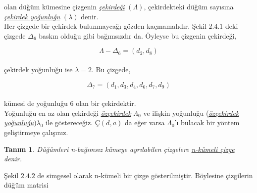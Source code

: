 \documentclass[12]{article}
\newtheorem{definition}{Tanım}[theorem]
\begin{document}
olan düğüm kümesine çizgenin \textit{\underline{çekirdeği}} $(\Lambda)$, çekirdekteki düğüm sayısına \textit{\underline{çekirdek yoğunluğu}} $(\lambda)$ denir. \\

Her çizgede bir çekirdek bulunmaycağı gözden kaçmamalıdır. Şekil $2.4.1$ deki  çizgede $\Delta_6$ baskın olduğu gibi bağımsızdır da. Öyleyse bu çizgenin çekirdeği,

$$ \Lambda - \Delta_6 = (d_2,d_8) $$ \\
çekirdek yoğunluğu ise $ \lambda = 2 $. 
Bu çizgede, 

$$ \Delta_7 = (d_1 , d_3 , d_4 , d_6 , d_7 , d_9) $$\\ 
kümesi de yoğunluğu 6 olan bir çekirdektir.\\

Yoğunluğu en az olan çekirdeği \textit { \underline {özçekirdek} } $ \Lambda_0 $ ve ilişkin yoğunluğu (\textit{\underline{özçekirdek yoğunluğu}})$ \lambda_0 $ ile göstereceğiz. $ Ç(d,a) $ da eğer varsa $ \Lambda_0 $'ı bulacak bir yöntem geliştirmeye çalışınız.

\begin{definition}
Düğümleri n-bağımsız kümeye ayrılabilen çizgelere \textit{\underline{n-kümeli çizge}} denir. 
\end{definition}

Şekil $2.4.2$ de simgesel olarak n-kümeli bir çizge gösterilmiştir. Böylesine çizgilerin düğüm matrisi
\end{document}
